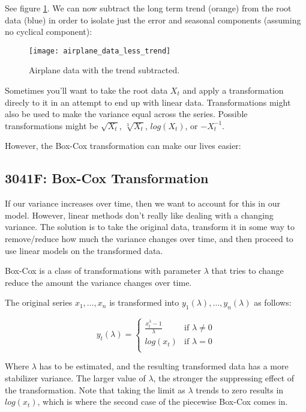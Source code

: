     See figure \ref{fig:airplane_data_less_trend}. 
    We can now subtract the long term trend (orange) from the root data (blue) 
    in order to isolate just the error and seasonal components (assuming no 
    cyclical component):
    \begin{figure}[t]
        \centering
        \texttt{[image: airplane\_data\_less\_trend]}
        \caption{Airplane data with the trend subtracted.}
        \label{fig:airplane_data_less_trend}
    \end{figure}

    Sometimes you'll want to take the root data $X_t$ and apply a transformation direcly to it
    in an attempt to end up with linear data. Transformations might also be used to make the variance equal across the series.
    Possible transformations might be $\sqrt{X_t}$, $\sqrt[3]{X_t}$, $log(X_t)$, or $-X_t^{-1}$.

    However, the Box-Cox transformation can make our lives easier:

    \subsection{3041F: Box-Cox Transformation}
    If our variance increases over time, then we want to account for this in our model. However, linear methods don't really like dealing with a changing variance. The solution is to take the original data, transform it in some way to remove/reduce how much the variance changes over time, and then proceed to use linear models on the transformed data.

    Box-Cox is a class of transformations with parameter $\lambda$  that tries to change reduce the amount the variance changes over time.

    The original series $x_1, \dots, x_n$ is transformed into $y_1(\lambda), \dots, y_n(\lambda)$ as follows:

    \begin{equation*}
        y_t(\lambda) =
        \begin{cases}
            \frac{x_t^{\lambda} - 1}{\lambda}  & \text{if $\lambda \ne 0$} \\[2ex]
            log(x_t) & \text{if $\lambda = 0$} \\
        \end{cases}
        \end{equation*}

        Where $\lambda$ has to be estimated, and the resulting transformed data has a more stabilizer variance. 
        The larger value of $\lambda$, the stronger the suppressing effect of the transformation.
        Note that taking the limit as $\lambda$ trends to zero results in $log(x_t)$, which is where
        the second case of the piecewise Box-Cox comes in.

